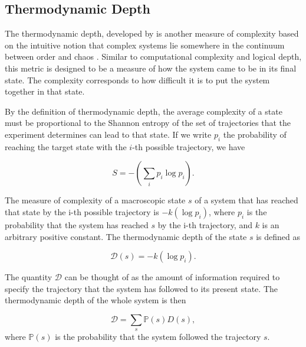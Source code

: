 \subsection{Thermodynamic Depth}

The thermodynamic depth, developed by
\textcite{lloydComplexityThermodynamicDepth1988} is another measure of
complexity based on the intuitive notion that complex systems lie somewhere in
the continuum between order and chaos
\parencite{chaitinInformationRandomnessIncompleteness1990,
  ceccattoComplexityHierarchicalSystems1988, deutschQuantumTheoryChurch1985}.
Similar to computational complexity and logical depth, this metric is designed
to be a measure of how the system came to be in its final state. The complexity
corresponds to how difficult it is to put the system together in that state.

By the definition of thermodynamic depth, the average complexity of a state must be
proportional to the Shannon entropy
\parencite{shannonMathematicalTheoryCommunication1975} of the set of
trajectories that the experiment determines can lead to that state. If we write $p_i$ 
the probability of reaching the target state with the $i$-th possible trajectory, we have 

\begin{equation}
  \label{eq:3}
  S = -\left(\sum_{i} p_{i} \log p_{i}\right).
\end{equation}

The measure of complexity of a macroscopic state $s$ of a system that has
reached that state by the i-th possible trajectory is $-k(\log p_{i})$, where
$p_{i}$ is the probability that the system has reached $s$ by the i-th
trajectory, and $k$ is an arbitrary positive constant. The thermodynamic depth of
the state $s$ is defined as

\begin{equation}
  \label{eq:4}
  \mathcal{D}(s) = -k(\log p_{i}).
\end{equation}

The quantity $\mathcal{D}$ can be thought of as the amount of information
required to specify the trajectory that the system has followed to its present
state. The thermodynamic depth of the whole system is then

\begin{equation}
  \label{eq:5}
  \mathcal{D} = \sum_{s}\mathbb{P}(s)D(s),
\end{equation}
where $\mathbb{P}(s)$ is the probability that the system followed the
trajectory $s$.

